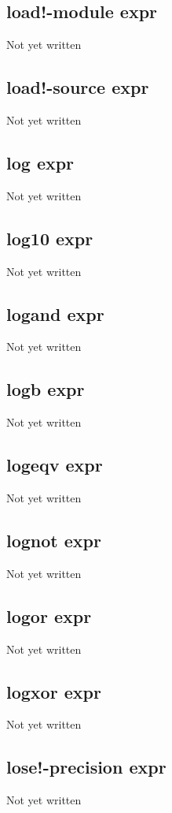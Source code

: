 \documentclass[a4paper,11pt]{article}
\begin{document}
\subsection{\ttfamily load!-module expr}
Not yet written

\subsection{\ttfamily load!-source expr}
Not yet written

\subsection{\ttfamily log expr}
Not yet written

\subsection{\ttfamily log10 expr}
Not yet written

\subsection{\ttfamily logand expr}
Not yet written

\subsection{\ttfamily logb expr}
Not yet written

\subsection{\ttfamily logeqv expr}
Not yet written

\subsection{\ttfamily lognot expr}
Not yet written

\subsection{\ttfamily logor expr}
Not yet written

\subsection{\ttfamily logxor expr}
Not yet written

\subsection{\ttfamily lose!-precision expr}
Not yet written
\end{document}
